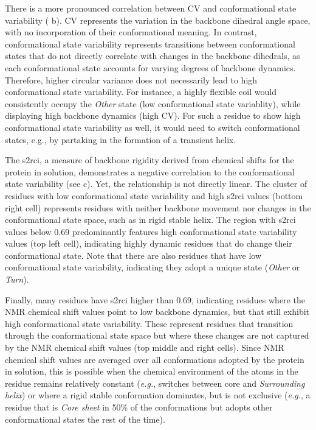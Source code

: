 There is a more pronounced correlation between CV and conformational state variability ( b). CV represents the variation in the  backbone dihedral angle space, with no incorporation of their conformational meaning. In contrast, conformational state variability represents transitions between conformational states that do not directly correlate with changes in the backbone dihedrals, as each conformational state accounts for varying degrees of backbone dynamics. Therefore, higher circular variance does not necessarily lead to high conformational state variability. For instance, a highly flexible coil would consistently occupy the \textit{Other} state (low conformational state variablity), while displaying high backbone dynamics (high CV). For such a residue to show high conformational state variability as well, it would need to switch conformational states, e.g., by partaking in the formation of a transient helix.

The \gls{s2rci}, a measure of backbone rigidity derived from chemical shifts for the protein in solution, demonstrates a negative correlation to the conformational state variability (see  c). Yet, the relationship is not directly linear. The cluster of residues with low conformational state variability and high \gls{s2rci} values (bottom right cell) represents residues with neither backbone movement nor changes in the conformational state space, such as in rigid stable helix. The region with \gls{s2rci} values below 0.69 predominantly features high conformational state variability values (top left cell), indicating highly dynamic residues that do change their conformational state. Note that there are also residues that have low conformational state variability, indicating they adopt a unique state (\textit{Other} or \textit{Turn}).

Finally, many residues have \gls{s2rci} higher than 0.69, indicating residues where the NMR chemical shift values point to low backbone dynamics, but that still exhibit high conformational state variability. These represent residues that transition through the conformational state space but where these changes are not captured by the NMR chemical shift values (top middle and right cells). Since NMR chemical shift values are averaged over all conformations adopted by the protein in solution, this is possible when the chemical environment of the atoms in the residue remains relatively constant (\textit{e.g.}, switches between core and \textit{Surrounding helix}) or where a rigid stable conformation dominates, but is not exclusive (\textit{e.g.}, a residue that is \textit{Core sheet} in 50\% of the conformations but adopts other conformational states the rest of the time). 


